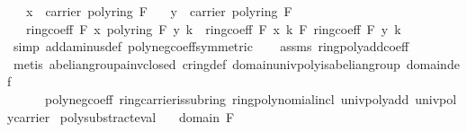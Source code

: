 \begin{isabellebody}
\ \ \ {\isachardoublequoteopen}x\ {\isasymin}\ carrier\ {\isacharparenleft}{\kern0pt}poly{\isacharunderscore}{\kern0pt}ring\ F{\isacharparenright}{\kern0pt}{\isachardoublequoteclose}\isanewline
\ \ \ {\isachardoublequoteopen}y\ {\isasymin}\ carrier\ {\isacharparenleft}{\kern0pt}poly{\isacharunderscore}{\kern0pt}ring\ F{\isacharparenright}{\kern0pt}{\isachardoublequoteclose}\isanewline
\ \ \ {\isachardoublequoteopen}ring{\isachardot}{\kern0pt}coeff\ F\ {\isacharparenleft}{\kern0pt}x\ {\isasymominus}\isactrlbsub poly{\isacharunderscore}{\kern0pt}ring\ F\isactrlesub \ y{\isacharparenright}{\kern0pt}\ k\ {\isacharequal}{\kern0pt}\ ring{\isachardot}{\kern0pt}coeff\ F\ x\ k\ {\isasymominus}\isactrlbsub F\isactrlesub \ ring{\isachardot}{\kern0pt}coeff\ F\ y\ k{\isachardoublequoteclose}\isanewline
%
\isadelimproof
\ \ %
\endisadelimproof
%
\isatagproof
{}\isamarkupfalse%
\ {\isacharparenleft}{\kern0pt}simp\ add{\isacharcolon}{\kern0pt}a{\isacharunderscore}{\kern0pt}minus{\isacharunderscore}{\kern0pt}def\ poly{\isacharunderscore}{\kern0pt}neg{\isacharunderscore}{\kern0pt}coeff{\isacharbrackleft}{\kern0pt}symmetric{\isacharbrackright}{\kern0pt}{\isacharparenright}{\kern0pt}\isanewline
\ \ \isamarkupfalse%
\ assms\ ring{\isachardot}{\kern0pt}poly{\isacharunderscore}{\kern0pt}add{\isacharunderscore}{\kern0pt}coeff\ \isanewline
\ \ \isamarkupfalse%
\ {\isacharparenleft}{\kern0pt}metis\ abelian{\isacharunderscore}{\kern0pt}group{\isachardot}{\kern0pt}a{\isacharunderscore}{\kern0pt}inv{\isacharunderscore}{\kern0pt}closed\ cring{\isacharunderscore}{\kern0pt}def\ domain{\isachardot}{\kern0pt}univ{\isacharunderscore}{\kern0pt}poly{\isacharunderscore}{\kern0pt}is{\isacharunderscore}{\kern0pt}abelian{\isacharunderscore}{\kern0pt}group\ domain{\isacharunderscore}{\kern0pt}def\ \isanewline
\ \ \ \ \ \ poly{\isacharunderscore}{\kern0pt}neg{\isacharunderscore}{\kern0pt}coeff\ ring{\isachardot}{\kern0pt}carrier{\isacharunderscore}{\kern0pt}is{\isacharunderscore}{\kern0pt}subring\ ring{\isachardot}{\kern0pt}polynomial{\isacharunderscore}{\kern0pt}incl\ univ{\isacharunderscore}{\kern0pt}poly{\isacharunderscore}{\kern0pt}add\ univ{\isacharunderscore}{\kern0pt}poly{\isacharunderscore}{\kern0pt}carrier{\isacharparenright}{\kern0pt}%
\endisatagproof
{\isafoldproof}%
%
\isadelimproof
\isanewline
%
\endisadelimproof
\isanewline
{}\isamarkupfalse%
\ poly{\isacharunderscore}{\kern0pt}substract{\isacharunderscore}{\kern0pt}eval{\isacharcolon}{\kern0pt}\isanewline
\ \ \ {\isachardoublequoteopen}domain\ F{\isachardoublequoteclose}\isanewline

\end{isabellebody}

